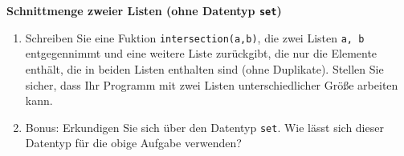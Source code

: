 \textbf{Schnittmenge zweier Listen (ohne Datentyp \texttt{set})}
\begin{enumerate}
	\item Schreiben Sie eine Fuktion \verb|intersection(a,b)|, die zwei Listen \verb|a, b| entgegennimmt und eine weitere Liste zurückgibt, die nur die Elemente enthält, die in beiden Listen enthalten sind (ohne Duplikate). Stellen Sie sicher, dass Ihr Programm mit zwei Listen unterschiedlicher Größe arbeiten kann.
\item Bonus: Erkundigen Sie sich über den Datentyp \texttt{set}. Wie lässt sich dieser Datentyp für die obige Aufgabe verwenden?
\end{enumerate}